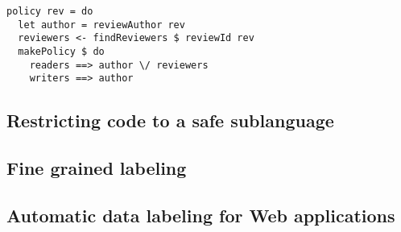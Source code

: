 \begin{verbatim}
policy rev = do
  let author = reviewAuthor rev
  reviewers <- findReviewers $ reviewId rev
  makePolicy $ do
    readers ==> author \/ reviewers
    writers ==> author
\end{verbatim}

\subsection{Restricting code to a safe sublanguage}
\subsection{Fine grained labeling}
\subsection{Automatic data labeling for Web applications}
